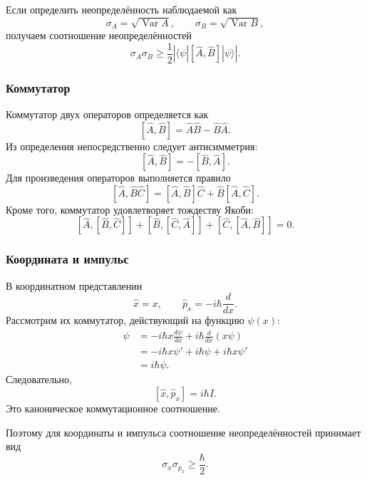 \documentclass[12pt,a4paper]{article}
\begin{document}
Если определить неопределённость наблюдаемой как
\[
    \sigma_A
    =
    \sqrt{\operatorname{Var}A},
    \qquad
    \sigma_B
    =
    \sqrt{\operatorname{Var}B},
\]
получаем соотношение неопределённостей
\[
    \boxed{
        \sigma_A\sigma_B
        \geq
        \frac12
        \left|
            \langle\psi|
                [\hat A,\hat B]
            |\psi\rangle
        \right|
    }.
\]


\subsubsection{Коммутатор}

Коммутатор двух операторов определяется как
\[
    \boxed{
        [\hat A,\hat B]
        =
        \hat A\hat B-\hat B\hat A
    }.
\]
Из определения непосредственно следует антисимметрия:
\[
    \boxed{
        [\hat A,\hat B]
        =
        -[\hat B,\hat A]
    }.
\]
Для произведения операторов выполняется правило
\[
    \boxed{
        [\hat A,\hat B\hat C]
        =
        [\hat A,\hat B]\hat C
        +
        \hat B[\hat A,\hat C]
    }.
\]
Кроме того, коммутатор удовлетворяет тождеству Якоби:
\[
    \boxed{
    [\hat A,[\hat B,\hat C]]
    +
    [\hat B,[\hat C,\hat A]]
    +
    [\hat C,[\hat A,\hat B]]
    =
    0
    }.
\]


\subsubsection{Координата и импульс}

В координатном представлении
\[
    \hat x=x,
    \qquad
    \hat p_x
    =
    -i\hbar\frac{d}{dx}.
\]
Рассмотрим их коммутатор, действующий на функцию $\psi(x)$:
\begin{align*}
    [\hat x,\hat p_x]\psi
    &=
    -i\hbar x\frac{d\psi}{dx}
    +
    i\hbar\frac{d}{dx}(x\psi) \\
    &=
    -i\hbar x\psi'
    +
    i\hbar\psi
    +
    i\hbar x\psi' \\
    &=
    i\hbar\psi.
\end{align*}
Следовательно,
\[
    \boxed{
        [\hat x,\hat p_x]
        =
        i\hbar\hat I
    }.
\]
Это каноническое коммутационное соотношение.

Поэтому для координаты и импульса соотношение неопределённостей принимает
вид
\[
    \boxed{
        \sigma_x\sigma_{p_x}
        \geq
        \frac{\hbar}{2}
    }.
\]
\end{document}

